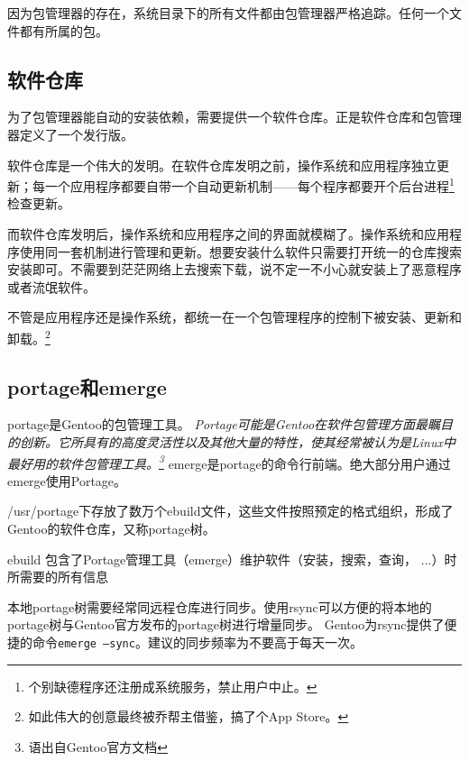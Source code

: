 因为包管理器的存在，系统目录下的所有文件都由包管理器严格追踪。任何一个文件都有所属的包。

\subsection{软件仓库}

为了包管理器能自动的安装依赖，需要提供一个软件仓库。正是软件仓库和包管理器定义了一个发行版。

软件仓库是一个伟大的发明。在软件仓库发明之前，操作系统和应用程序独立更新；每一个应用程序都要自带一个自动更新机制——每个程序都要开个后台进程\footnote{个别缺德程序还注册成系统服务，禁止用户中止。}检查更新。

而软件仓库发明后，操作系统和应用程序之间的界面就模糊了。操作系统和应用程序使用同一套机制进行管理和更新。想要安装什么软件只需要打开统一的仓库搜索安装即可。不需要到茫茫网络上去搜索下载，说不定一不小心就安装上了恶意程序或者流氓软件。

不管是应用程序还是操作系统，都统一在一个包管理程序的控制下被安装、更新和卸载。\footnote{如此伟大的创意最终被乔帮主借鉴，搞了个App Store。}

\subsection{portage和emerge}\label{sec:emerge}

portage是Gentoo的包管理工具。
\textit{ Portage可能是Gentoo在软件包管理方面最瞩目的创新。它所具有的高度灵活性以及其他大量的特性，使其经常被认为是Linux中最好用的软件包管理工具。\footnote{语出自Gentoo官方文档}}
emerge是portage的命令行前端。绝大部分用户通过emerge使用Portage。

/usr/portage下存放了数万个ebuild文件，这些文件按照预定的格式组织，形成了Gentoo的软件仓库，又称portage树。

ebuild 包含了Portage管理工具（emerge）维护软件（安装，搜索，查询， ...）时所需要的所有信息

本地portage树需要经常同远程仓库进行同步。使用rsync可以方便的将本地的portage树与Gentoo官方发布的portage树进行增量同步。
Gentoo为rsync提供了便捷的命令{\tt emerge --sync}。建议的同步频率为不要高于每天一次。


